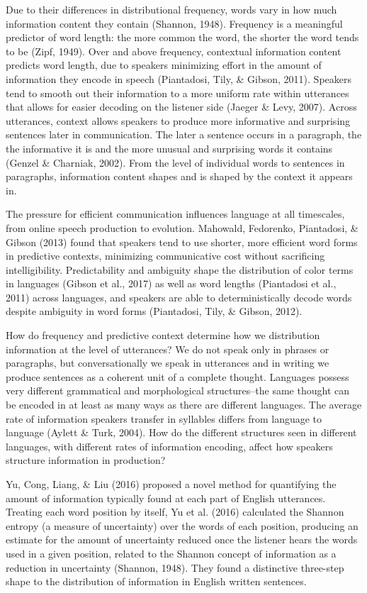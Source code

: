\documentclass[11pt,]{article}
\begin{document}
Due to their differences in distributional frequency, words vary in how much information content they contain (Shannon, 1948). Frequency is a meaningful predictor of word length: the more common the word, the shorter the word tends to be (Zipf, 1949). Over and above frequency, contextual information content predicts word length, due to speakers minimizing effort in the amount of information they encode in speech (Piantadosi, Tily, \& Gibson, 2011). Speakers tend to smooth out their information to a more uniform rate within utterances that allows for easier decoding on the listener side (Jaeger \& Levy, 2007). Across utterances, context allows speakers to produce more informative and surprising sentences later in communication. The later a sentence occurs in a paragraph, the the informative it is and the more unusual and surprising words it contains (Genzel \& Charniak, 2002). From the level of individual words to sentences in paragraphs, information content shapes and is shaped by the context it appears in.

The pressure for efficient communication influences language at all timescales, from online speech production to evolution. Mahowald, Fedorenko, Piantadosi, \& Gibson (2013) found that speakers tend to use shorter, more efficient word forms in predictive contexts, minimizing communicative cost without sacrificing intelligibility. Predictability and ambiguity shape the distribution of color terms in languages (Gibson et al., 2017) as well as word lengths (Piantadosi et al., 2011) across languages, and speakers are able to deterministically decode words despite ambiguity in word forms (Piantadosi, Tily, \& Gibson, 2012).

How do frequency and predictive context determine how we distribution information at the level of utterances? We do not speak only in phrases or paragraphs, but conversationally we speak in utterances and in writing we produce sentences as a coherent unit of a complete thought. Languages possess very different grammatical and morphological structures--the same thought can be encoded in at least as many ways as there are different languages. The average rate of information speakers transfer in syllables differs from language to language (Aylett \& Turk, 2004). How do the different structures seen in different languages, with different rates of information encoding, affect how speakers structure information in production?

Yu, Cong, Liang, \& Liu (2016) proposed a novel method for quantifying the amount of information typically found at each part of English utterances. Treating each word position by itself, Yu et al. (2016) calculated the Shannon entropy (a measure of uncertainty) over the words of each position, producing an estimate for the amount of uncertainty reduced once the listener hears the words used in a given position, related to the Shannon concept of information as a reduction in uncertainty (Shannon, 1948). They found a distinctive three-step shape to the distribution of information in English written sentences.
\end{document}
